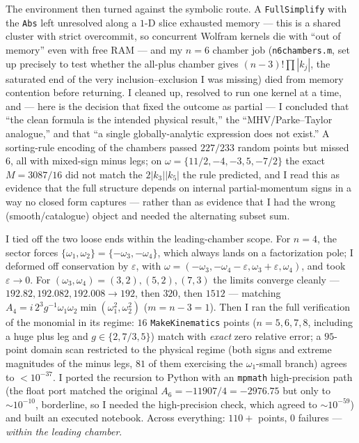 \documentclass{article}
\begin{document}
The environment then turned against the symbolic route. A \texttt{FullSimplify}
with the \texttt{Abs} left unresolved along a $1$-D slice exhausted memory --- this
is a shared cluster with strict overcommit, so concurrent Wolfram kernels die
with ``out of memory'' even with free RAM --- and my $n=6$ chamber job
(\texttt{n6chambers.m}, set up precisely to test whether the all-plus chamber
gives $(n-3)!\prod|k_j|$, the saturated end of the very inclusion--exclusion I was
missing) died from memory contention before returning. I cleaned up, resolved to
run one kernel at a time, and --- here is the decision that fixed the outcome as
partial --- I concluded that ``the clean formula is the intended physical
result,'' the ``MHV/Parke--Taylor analogue,'' and that ``a single
globally-analytic expression does not exist.'' A sorting-rule encoding of the
chambers passed $227/233$ random points but missed $6$, all with mixed-sign minus
legs; on $\omega=\{11/2,-4,-3,5,-7/2\}$ the exact $M=3087/16$ did not match the
$2|k_3||k_5|$ the rule predicted, and I read this as evidence that the full
structure depends on internal partial-momentum signs in a way no closed form
captures --- rather than as evidence that I had the wrong (smooth/catalogue)
object and needed the alternating subset sum.

I tied off the two loose ends within the leading-chamber scope. For $n=4$, the
sector forces $\{\omega_1,\omega_2\}=\{-\omega_3,-\omega_4\}$, which always lands
on a factorization pole; I deformed off conservation by $\varepsilon$, with
$\omega=(-\omega_3,-\omega_4-\varepsilon,\omega_3+\varepsilon,\omega_4)$, and took
$\varepsilon\to0$. For $(\omega_3,\omega_4)=(3,2),(5,2),(7,3)$ the limits
converge cleanly --- $192.82,192.082,192.008\to192$, then $320$, then $1512$ ---
matching $A_4=i\,2^{3}g^{-1}\omega_1\omega_2\min(\omega_1^2,\omega_2^2)$ ($m=n-3=1$).
Then I ran the full verification of the monomial in its regime: $16$
\texttt{MakeKinematics} points ($n=5,6,7,8$, including a huge plus leg and
$g\in\{2,7/3,5\}$) match with \emph{exact} zero relative error; a $95$-point
domain scan restricted to the physical regime (both signs and extreme magnitudes
of the minus legs, $81$ of them exercising the $\omega_1$-small branch) agrees to
$<10^{-37}$. I ported the recursion to Python with an \texttt{mpmath}
high-precision path (the float port matched the original $A_6=-11907/4=-2976.75$
but only to $\sim10^{-10}$, borderline, so I needed the high-precision check,
which agreed to $\sim10^{-59}$) and built an executed notebook. Across everything:
$110+$ points, $0$ failures --- \emph{within the leading chamber}.
\end{document}
